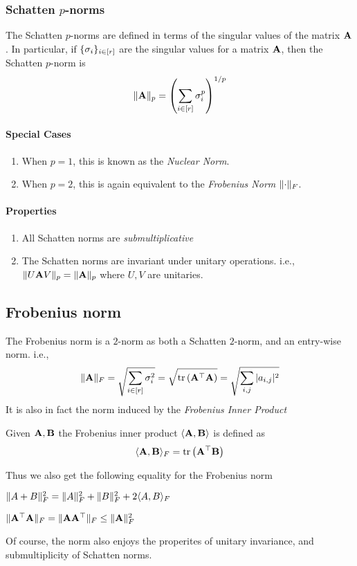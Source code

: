 \subsubsection{Schatten $p$-norms}
The Schatten $p$-norms are defined in terms of the singular values of the matrix $\mathbf{A}$. In particular,
if $\{ \sigma_i \}_{i \in [r]}$ are the singular values for a matrix $\mathbf{A}$, then the Schatten $p$-norm is
\begin{align*}
    \lVert \mathbf{A} \rVert_p = \left( \sum_{i \in [r]} \sigma_i^p \right)^{1/p}
\end{align*}

\paragraph{Special Cases}
\begin{enumerate}
    \item When $p = 1$, this is known as the {\em Nuclear Norm}.
    \item When $p = 2$, this is again equivalent to the {\em Frobenius Norm} $\lVert \cdot \rVert_F$.
\end{enumerate}
\paragraph{Properties}
\begin{enumerate}
    \item All Schatten norms are {\em submultiplicative}
    \item The Schatten norms are invariant under unitary operations. i.e., $\lVert U\mathbf{A} V \rVert_p = \lVert \mathbf{A} \rVert_p$ where $U,V$ are unitaries.
\end{enumerate}

\subsection{Frobenius norm}
The Frobenius norm is a $2$-norm as both a Schatten $2$-norm, and an entry-wise norm. i.e.,
\begin{align*}
    \lVert \mathbf{A} \rVert_F = \sqrt{\sum_{i \in [r]} \sigma_i^2} = \sqrt{\operatorname*{tr}\left( \mathbf{A}^\top \mathbf{A} \right)} = \sqrt{\sum_{i,j} |a_{i,j}|^2}
\end{align*}
It is also in fact the norm induced by the {\em Frobenius Inner Product}
\begin{defn}
    Given $\mathbf{A}, {\bf B}$ the Frobenius inner product $\langle \mathbf{A}, {\bf B} \rangle$ is defined as
    \begin{align*}
        \langle \mathbf{A}, {\bf B} \rangle_F = \operatorname*{tr}\left( \mathbf{A}^\top {\bf B} \right) 
    \end{align*}
\end{defn}
Thus we also get the following equality for the Frobenius norm
\begin{prop}
$\lVert A + B \rVert_F^2 = \lVert A \rVert_F^2 + \lVert B \rVert_F^2 + 2\langle A, B \rangle_F$
\end{prop}
\begin{prop}
    $\lVert \mathbf{A}^\top\mathbf{A} \rVert_F = \lVert \mathbf{A}\mathbf{A}^\top \rVert_F \leq \lVert \mathbf{A} \rVert_F^2$
\end{prop}
Of course, the norm also enjoys the properites of unitary invariance, and submultiplicity of Schatten norms.
